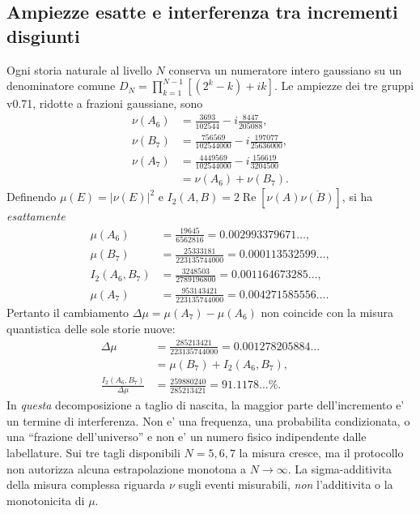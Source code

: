 \documentclass[11pt,a4paper]{article}
\begin{document}
\subsection*{Ampiezze esatte e interferenza tra incrementi disgiunti}
Ogni storia naturale al livello $N$ conserva un numeratore intero gaussiano su un denominatore comune $D_N=\prod_{k=1}^{N-1}[(2^k-k)+ik]$. Le ampiezze dei tre gruppi v0.71, ridotte a frazioni gaussiane, sono
\begin{equation}
\begin{aligned}
\nu(A_6)&=\frac{3693}{102544}-i\frac{8447}{205088},\\
\nu(B_7)&=\frac{756569}{102544000}-i\frac{197077}{25636000},\\
\nu(A_7)&=\frac{4449569}{102544000}-i\frac{156619}{3204500}\\
&=\nu(A_6)+\nu(B_7).
\end{aligned}\tag{FI.2}
\end{equation}
Definendo $\mu(E)=|\nu(E)|^2$ e $I_2(A,B)=2\operatorname{Re}[\nu(A)\overline{\nu(B)}]$, si ha \emph{esattamente}
\begin{equation}
\begin{aligned}
\mu(A_6)&=\frac{19645}{6562816}=0.002993379671\ldots,\\
\mu(B_7)&=\frac{25333181}{223135744000}=0.000113532599\ldots,\\
I_2(A_6,B_7)&=\frac{3248503}{2789196800}=0.001164673285\ldots,\\
\mu(A_7)&=\frac{953143421}{223135744000}=0.004271585556\ldots.
\end{aligned}\tag{FI.3}
\end{equation}
Pertanto il cambiamento $\Delta\mu=\mu(A_7)-\mu(A_6)$ non coincide con la misura quantistica delle sole storie nuove:
\begin{equation}
\begin{aligned}
\Delta\mu&=\frac{285213421}{223135744000}=0.001278205884\ldots\\
 &=\mu(B_7)+I_2(A_6,B_7),\\
\frac{I_2(A_6,B_7)}{\Delta\mu}&=\frac{259880240}{285213421}=91.1178\ldots\%.
\end{aligned}\tag{FI.4}
\end{equation}
In \emph{questa} decomposizione a taglio di nascita, la maggior parte dell'incremento e' un termine di interferenza. Non e' una frequenza, una probabilita condizionata, o una ``frazione dell'universo'' e non e' un numero fisico indipendente dalle labellature. Sui tre tagli disponibili $N=5,6,7$ la misura cresce, ma il protocollo non autorizza alcuna estrapolazione monotona a $N\to\infty$. La sigma-additivita della misura complessa riguarda $\nu$ sugli eventi misurabili, \emph{non} l'additivita o la monotonicita di $\mu$.
\end{document}
